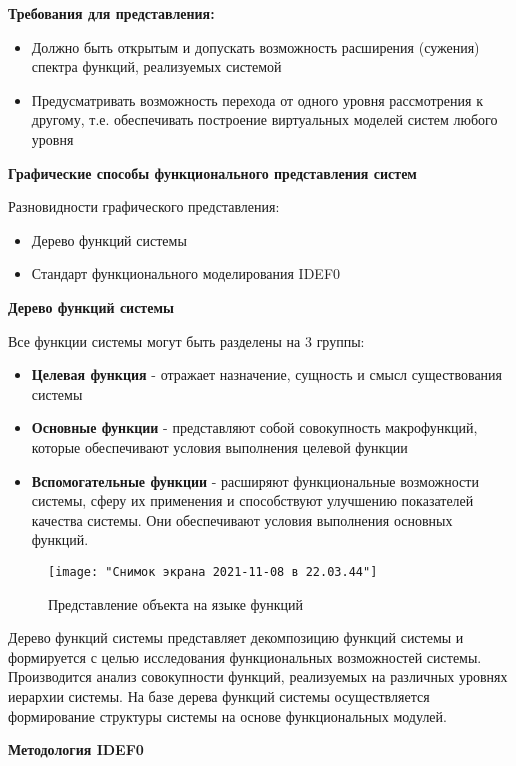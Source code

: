 \documentclass[a4paper]{article}
\begin{document}
	\textbf{Требования для представления:}
	\begin{itemize}
		\item Должно быть открытым и допускать возможность расширения (сужения) спектра функций, реализуемых системой
		\item Предусматривать возможность перехода от одного уровня рассмотрения к другому, т.е. обеспечивать построение виртуальных моделей систем любого уровня
	\end{itemize}
	
	\textbf{Графические способы функционального представления систем}
	
	Разновидности графического представления:
	\begin{itemize}
		\item Дерево функций системы
		\item Стандарт функционального моделирования IDEF0
	\end{itemize}

	\textbf{Дерево функций системы}
	
	Все функции системы могут быть разделены на 3 группы:
		\begin{itemize}
		\item \textbf{Целевая функция} - отражает назначение, сущность и смысл существования системы
		\item \textbf{Основные функции}  - представляют собой совокупность макрофункций, которые обеспечивают условия выполнения целевой функции
		\item \textbf{Вспомогательные функции}  - расширяют функциональные возможности системы, сферу их применения и способствуют улучшению показателей качества системы. Они обеспечивают условия выполнения основных функций.
	\end{itemize}
	
	\begin{figure}[h]
		\centering
		\texttt{[image: "Снимок экрана 2021-11-08 в 22.03.44"]}
		\caption{Представление объекта на языке функций}
		\label{fig:--2021-11-08--22}
	\end{figure}

	Дерево функций системы представляет декомпозицию функций системы и формируется с целью исследования функциональных возможностей системы. Производится анализ совокупности функций, реализуемых на различных уровнях иерархии системы. На базе дерева функций системы осуществляется формирование структуры системы на основе функциональных модулей.
	
	
	\textbf{Методология IDEF0}
	
\end{document}
